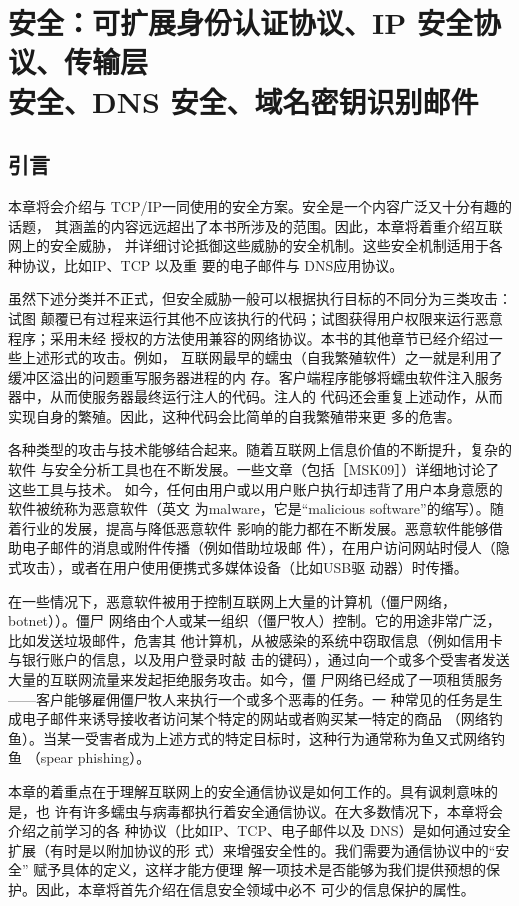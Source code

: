 \chapter{安全：可扩展身份认证协议、IP 安全协议、传输层\\ 
安全、DNS 安全、域名密钥识别邮件}
\section{引言}
本章将会介绍与 TCP/IP一同使用的安全方案。安全是一个内容广泛又十分有趣的话题，
其涵盖的内容远远超出了本书所涉及的范围。因此，本章将着重介绍互联网上的安全威胁，
并详细讨论抵御这些威胁的安全机制。这些安全机制适用于各种协议，比如IP、TCP 以及重
要的电子邮件与 DNS应用协议。

虽然下述分类并不正式，但安全威胁一般可以根据执行目标的不同分为三类攻击：试图
颠覆已有过程来运行其他不应该执行的代码；试图获得用户权限来运行恶意程序；采用未经
授权的方法使用兼容的网络协议。本书的其他章节已经介绍过一些上述形式的攻击。例如，
互联网最早的蠕虫（自我繁殖软件）之一就是利用了缓冲区溢出的问题重写服务器进程的内
存。客户端程序能够将蠕虫软件注入服务器中，从而使服务器最终运行注人的代码。注人的
代码还会重复上述动作，从而实现自身的繁殖。因此，这种代码会比简单的自我繁殖带来更
多的危害。

各种类型的攻击与技术能够结合起来。随着互联网上信息价值的不断提升，复杂的软件
与安全分析工具也在不断发展。一些文章（包括［MSK09］）详细地讨论了这些工具与技术。
如今，任何由用户或以用户账户执行却违背了用户本身意愿的软件被统称为恶意软件（英文
为malware，它是“malicious software”的缩写）。随着行业的发展，提高与降低恶意软件
影响的能力都在不断发展。恶意软件能够借助电子邮件的消息或附件传播（例如借助垃圾邮
件），在用户访问网站时侵人（隐式攻击），或者在用户使用便携式多媒体设备（比如USB驱
动器）时传播。

在一些情况下，恶意软件被用于控制互联网上大量的计算机（僵尸网络，botnet））。僵尸
网络由个人或某一组织（僵尸牧人）控制。它的用途非常广泛，比如发送垃圾邮件，危害其
他计算机，从被感染的系统中窃取信息（例如信用卡与银行账户的信息，以及用户登录时敲
击的键码），通过向一个或多个受害者发送大量的互联网流量来发起拒绝服务攻击。如今，僵
尸网络已经成了一项租赁服务——客户能够雇佣僵尸牧人来执行一个或多个恶毒的任务。一
种常见的任务是生成电子邮件来诱导接收者访问某个特定的网站或者购买某一特定的商品
（网络钓鱼）。当某一受害者成为上述方式的特定目标时，这种行为通常称为鱼又式网络钓鱼
（spear phishing）。

本章的着重点在于理解互联网上的安全通信协议是如何工作的。具有讽刺意味的是，也
许有许多蠕虫与病毒都执行着安全通信协议。在大多数情况下，本章将会介绍之前学习的各
种协议（比如IP、TCP、电子邮件以及 DNS）是如何通过安全扩展（有时是以附加协议的形
式）来增强安全性的。我们需要为通信协议中的“安全” 赋予具体的定义，这样才能方便理
解一项技术是否能够为我们提供预想的保护。因此，本章将首先介绍在信息安全领域中必不
可少的信息保护的属性。

